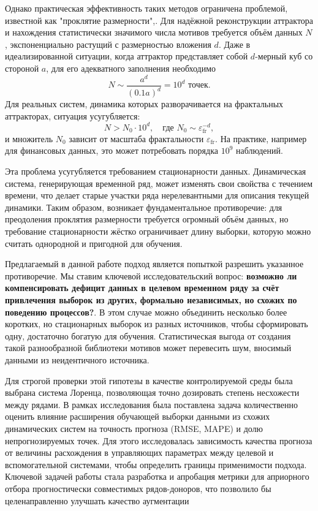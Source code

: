 \documentclass[a4paper,12pt]{extarticle}
\begin{document}
Однако практическая эффективность таких методов ограничена проблемой, известной как "проклятие размерности",\cite{MalinetskiyPotapov2002}.
 Для надёжной реконструкции аттрактора и нахождения статистически значимого числа мотивов требуется объём 
 данных $N$, экспоненциально растущий с размерностью вложения $d$. Даже в идеализированной ситуации, когда
  аттрактор представляет собой $d$-мерный куб со стороной $a$, для его адекватного заполнения необходимо
\begin{equation}
N \sim \frac{a^d}{(0.1a)^d} = 10^d \text{ точек}.
\end{equation}
Для реальных систем, динамика которых разворачивается на фрактальных аттракторах, ситуация усугубляется:
\begin{equation}
N > N_0 \cdot 10^d, \quad \text{где } N_0 \sim \varepsilon_{\text{fr}}^{-d},
\end{equation}
и множитель $N_0$ зависит от масштаба фрактальности $\varepsilon_{\text{fr}}$. На практике,
 например для финансовых данных, это может потребовать порядка $10^9$ наблюдений.

Эта проблема усугубляется требованием стационарности данных. Динамическая система,
 генерирующая временной ряд, может изменять свои свойства с течением времени, что 
 делает старые участки ряда нерелевантными для описания текущей динамики. Таким образом,
  возникает фундаментальное противоречие: для преодоления проклятия размерности требуется
   огромный объём данных, но требование стационарности жёстко ограничивает длину выборки,
    которую можно считать однородной и пригодной для обучения.

Предлагаемый в данной работе подход является попыткой разрешить указанное противоречие. Мы 
ставим ключевой исследовательский вопрос: \textbf{возможно ли компенсировать дефицит данных
 в целевом временном ряду за счёт привлечения выборок из других, формально независимых, но 
 схожих по поведению процессов?}. В этом случае можно объединить несколько более коротких,
  но стационарных выборок из разных источников, чтобы сформировать одну, достаточно богатую 
  для обучения. Статистическая выгода от создания такой разнообразной библиотеки мотивов может 
  перевесить шум, вносимый данными из неидентичного источника.

Для строгой проверки этой гипотезы в качестве контролируемой среды была выбрана система Лоренца,
 позволяющая точно дозировать степень несхожести между рядами. В рамках исследования была поставлена 
 задача количественно оценить влияние расширения обучающей выборки данными из схожих динамических систем 
 на точность прогноза (RMSE, MAPE) и долю непрогнозируемых точек. Для этого исследовалась зависимость
 качества прогноза от величины расхождения в управляющих параметрах между целевой и вспомогательной системами,
  чтобы определить границы применимости подхода. Ключевой задачей работы стала разработка
   и апробация метрики для априорного отбора прогностически совместимых рядов-доноров,
   что позволило бы целенаправленно улучшать качество аугментации
\end{document}
